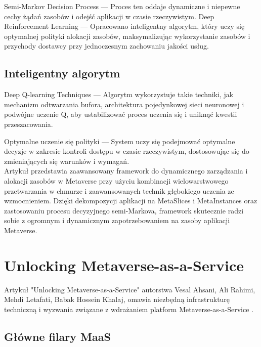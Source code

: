 Semi-Markov Decision Process  --- Proces ten oddaje dynamiczne i niepewne cechy żądań zasobów i odejść aplikacji w czasie rzeczywistym.
Deep Reinforcement Learning  --- Opracowano inteligentny algorytm, który uczy się optymalnej polityki alokacji zasobów, maksymalizując wykorzystanie zasobów i przychody dostawcy przy jednoczesnym zachowaniu jakości usług.

\subsection{Inteligentny algorytm}

Deep Q-learning Techniques --- Algorytm wykorzystuje takie techniki, jak mechanizm odtwarzania bufora, architektura pojedynkowej sieci neuronowej i podwójne uczenie Q, aby ustabilizować proces uczenia się i uniknąć kwestii przeszacowania.

Optymalne uczenie się polityki --- System uczy się podejmować optymalne decyzje w zakresie kontroli dostępu w czasie rzeczywistym, dostosowując się do zmieniających się warunków i wymagań.\\

Artykuł przedstawia zaawansowany framework do dynamicznego zarządzania i alokacji zasobów w Metaverse przy użyciu kombinacji wielowarstwowego przetwarzania w chmurze i zaawansowanych technik głębokiego uczenia ze wzmocnieniem. Dzięki dekompozycji aplikacji na MetaSlices i MetaInstances oraz zastosowaniu procesu decyzyjnego semi-Markova, framework skutecznie radzi sobie z ogromnym i dynamicznym zapotrzebowaniem na zasoby aplikacji Metaverse.

\section{Unlocking Metaverse-as-a-Service}

Artykuł "Unlocking Metaverse-as-a-Service" autorstwa Vesal Ahsani, Ali Rahimi, 
Mehdi Letafati, Babak Hossein Khalaj, omawia niezbędną infrastrukturę techniczną i wyzwania związane z wdrażaniem platform Metaverse-as-a-Service .

\subsection{Główne filary MaaS}


